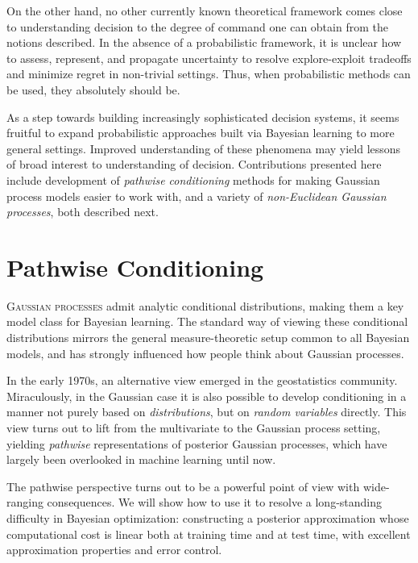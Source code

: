 \documentclass[11pt]{book}
\begin{document}
On the other hand, no other currently known theoretical framework comes close to understanding decision to the degree of command one can obtain from the notions described.
In the absence of a probabilistic framework, it is unclear how to assess, represent, and propagate uncertainty to resolve explore-exploit tradeoffs and minimize regret in non-trivial settings.
Thus, when probabilistic methods can be used, they absolutely should be.

As a step towards building increasingly sophisticated decision systems, it seems fruitful to expand probabilistic approaches built via Bayesian learning to more general settings.
Improved understanding of these phenomena may yield lessons of broad interest to understanding of decision.
Contributions presented here include development of \emph{pathwise conditioning} methods for making Gaussian process models easier to work with, and a variety of \emph{non-Euclidean Gaussian processes}, both described next.





\chapter{Pathwise Conditioning}
\label{ch:pathwise}

\lettrine{G}{aussian processes} admit analytic conditional distributions, making them a key model class for Bayesian learning.
The standard way of viewing these conditional distributions mirrors the general measure-theoretic setup common to all Bayesian models, and has strongly influenced how people think about Gaussian processes.

In the early 1970s, an alternative view emerged in the geostatistics community.
Miraculously, in the Gaussian case it is also possible to develop conditioning in a manner not purely based on \emph{distributions}, but on \emph{random variables} directly.
This view turns out to lift from the multivariate to the Gaussian process setting, yielding \emph{pathwise} representations of posterior Gaussian processes, which have largely been overlooked in machine learning until now.

The pathwise perspective turns out to be a powerful point of view with wide-ranging consequences.
We will show how to use it to resolve a long-standing difficulty in Bayesian optimization: constructing a posterior approximation whose computational cost is linear both at training time and at test time, with excellent approximation properties and error control.
\end{document}
